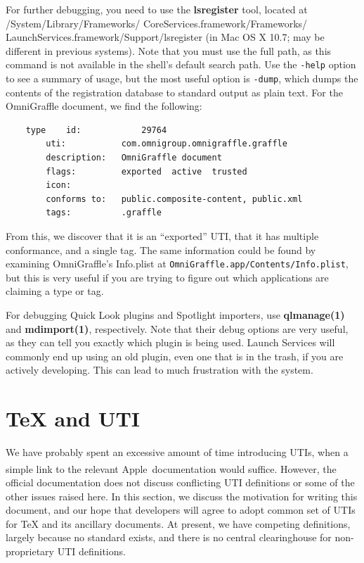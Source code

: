 \documentclass[11pt]{article}
\providecommand{\xspace}{~}
\newcommand*{\apple}{Apple\textsuperscript{\textregistered}\xspace}
\begin{document}
For further debugging, you need to use the \textbf{lsregister} tool, located at
/System/Library/Frameworks/\discretionary{}{}{}%
CoreServices.framework/Frameworks/\discretionary{}{}{}%
LaunchServices.framework/Support/lsregister 
(in Mac OS X 10.7; may be different in previous systems). Note that you
must use the full path, as this command is not available in the shell's
default search path.
Use the \texttt{-help} option to see a summary of
usage, but the most useful option is \texttt{-dump}, which dumps the contents
of the registration database to standard output as plain text. For the
OmniGraffle document, we find the following:
\begin{verbatim}
	type	id:            29764
		uti:           com.omnigroup.omnigraffle.graffle
		description:   OmniGraffle document
		flags:         exported  active  trusted  
		icon:          
		conforms to:   public.composite-content, public.xml
		tags:          .graffle
\end{verbatim}
From this, we discover that it is an “exported” UTI, that it has
multiple conformance, and a single tag. The same information
could be found by examining OmniGraffle's Info.plist at
\texttt{OmniGraffle.app/Contents/Info.plist}, but this is very useful
if you are trying to figure out which applications are claiming a type
or tag.

For debugging Quick Look plugins and Spotlight importers, use
\textbf{qlmanage(1)} and \textbf{mdimport(1)}, respectively. Note that
their debug options are very useful, as they can tell you exactly which
plugin is being used. Launch Services will commonly end up using an
old plugin, even one that is in the trash, if you are actively developing.
This can lead to much frustration with the system.

\section{\TeX{} and UTI}
We have probably spent an excessive amount of time introducing UTIs, when
a simple link to the relevant \apple documentation would suffice. However,
the official documentation does not discuss conflicting UTI definitions or
some of the other issues raised here. In this section, we discuss the
motivation for writing this document, and our hope that developers will
agree to adopt common set of UTIs for \TeX{} and its ancillary documents.
At present, we have competing definitions, largely because no standard 
exists, and there is no central clearinghouse for non-proprietary UTI 
definitions.
\end{document}
